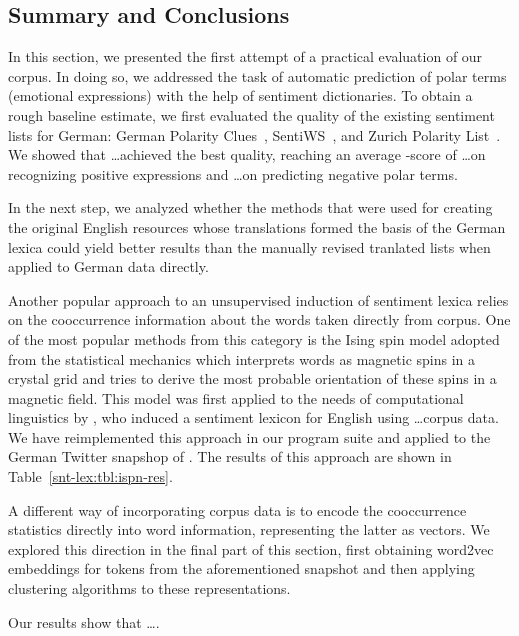 
\subsection{Summary and Conclusions}

In this section, we presented the first attempt of a practical
evaluation of our corpus.  In doing so, we addressed the task of
automatic prediction of polar terms (emotional expressions) with the
help of sentiment dictionaries.  To obtain a rough baseline estimate,
we first evaluated the quality of the existing sentiment lists for
German: German Polarity Clues~\cite{Waltinger:10},
SentiWS~\cite{Remus:10}, and Zurich Polarity List~\cite{Clematide:10}.
We showed that \ldots achieved the best quality, reaching an average
\F{}-score of \ldots on recognizing positive expressions and \ldots on
predicting negative polar terms.

In the next step, we analyzed whether the methods that were used for
creating the original English resources whose translations formed the
basis of the German lexica could yield better results than the
manually revised tranlated lists when applied to German data directly.

Another popular approach to an unsupervised induction of sentiment
lexica relies on the cooccurrence information about the words taken
directly from corpus.  One of the most popular methods from this
category is the Ising spin model adopted from the statistical
mechanics which interprets words as magnetic spins in a crystal grid
and tries to derive the most probable orientation of these spins in a
magnetic field.  This model was first applied to the needs of
computational linguistics by \citet{Takamura:05}, who induced a
sentiment lexicon for English using \ldots corpus data.  We have
reimplemented this approach in our program suite and applied to the
German Twitter snapshop of \citet{Scheffler:14}.  The results of this
approach are shown in Table~\ref{snt-lex:tbl:ispn-res}.

A different way of incorporating corpus data is to encode the
cooccurrence statistics directly into word information, representing
the latter as vectors.  We explored this direction in the final part
of this section, first obtaining word2vec embeddings for tokens from
the aforementioned snapshot and then applying clustering algorithms to
these representations.

Our results show that \ldots.

\newpage
